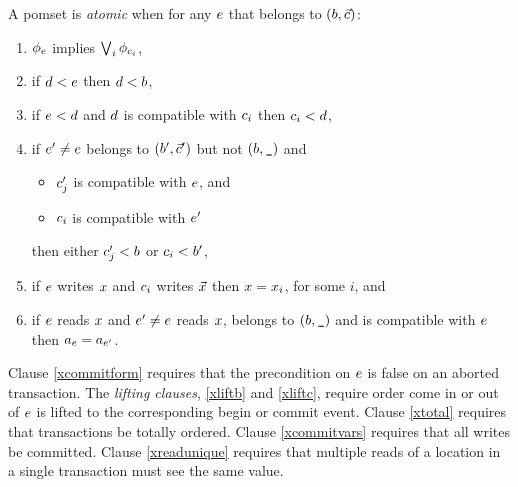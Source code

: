 \begin{definition}
  A pomset is \emph{atomic} when for any $e$ that belongs to $(b,\vec{c})$:
  \begin{enumerate}
  \item\label{xcommitform} $\phi_{e}$ implies $\textstyle\bigvee_i\phi_{c_i}$,
  \item\label{xliftb} if $d<e$ then $d<b$, 
  \item\label{xliftc} if $e<d$ and $d$ is compatible with
    $c_i$ then $c_i<d$, 
  \item\label{xtotal} if $e'\neq e$ belongs to $(b',\vec{c}')$ but not
    $(b,\texttt{\_})$ and
    \begin{itemize}
    \item $c'_j$ is compatible with $e$, and 
    \item $c_i$ is compatible with $e'$ 
    \end{itemize}
    then either
    $c'_j<b$ or
    $c_i<b'$,
  \item\label{xcommitvars} if $e$ writes $x$ and $c_i$ writes
    $\vec{x}$ then $x=x_i$, for some $i$, and
  \item\label{xreadunique} if $e$ reads $x$ and $e'\neq e$ reads
    $x$, belongs to $(b,\texttt{\_})$ and is compatible with $e$
    then $a_{e}=a_{e'}$.
  \end{enumerate}
\end{definition}
Clause \eqref{xcommitform} requires that the precondition on $e$ is false on an
aborted transaction.
The \emph{lifting clauses}, \eqref{xliftb} and \eqref{xliftc}, require order
come in or out of $e$ is lifted to the corresponding begin or commit event.
Clause \eqref{xtotal} requires that transactions be totally ordered.
Clause \eqref{xcommitvars} requires that all writes be committed.
Clause \eqref{xreadunique} requires that multiple reads of a location in a
single transaction must see the same value.


